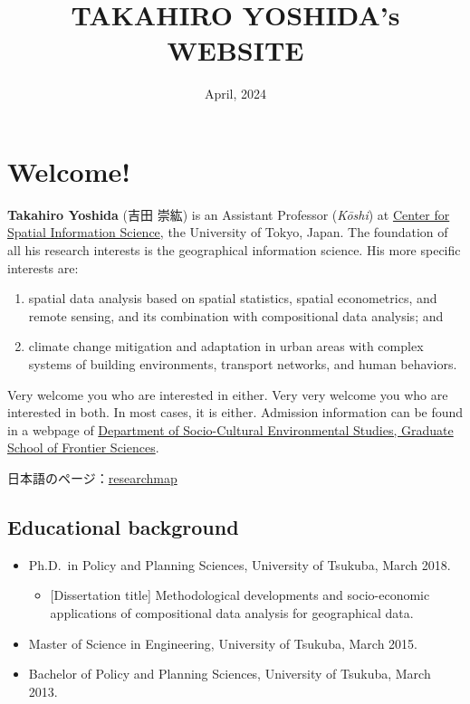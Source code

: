 \documentclass[
]{book}
\title{TAKAHIRO YOSHIDA's WEBSITE}
\author{}
\date{\vspace{-2.5em}April, 2024}
\providecommand{\tightlist}{%
  \setlength{\itemsep}{0pt}\setlength{\parskip}{0pt}}
\begin{document}
\maketitle

{
\setcounter{tocdepth}{1}
\tableofcontents
}
\chapter*{Welcome!}\label{welcome}

\textbf{Takahiro Yoshida} (吉田 崇紘) is an Assistant Professor (\emph{Kōshi}) at \href{https://www.csis.u-tokyo.ac.jp/en/}{Center for Spatial Information Science}, the University of Tokyo, Japan. The foundation of all his research interests is the geographical information science. His more specific interests are:

\begin{enumerate}
\def\labelenumi{(\arabic{enumi})}
\tightlist
\item
  spatial data analysis based on spatial statistics, spatial econometrics, and remote sensing, and its combination with compositional data analysis; and
\item
  climate change mitigation and adaptation in urban areas with complex systems of building environments, transport networks, and human behaviors.
\end{enumerate}

Very welcome you who are interested in either. Very very welcome you who are interested in both. In most cases, it is either. Admission information can be found in a webpage of \href{https://sbk.k.u-tokyo.ac.jp/index_e.html}{Department of Socio-Cultural Environmental Studies, Graduate School of Frontier Sciences}.

日本語のページ：\href{https://researchmap.jp/yoshida.takahiro}{researchmap}

\section*{Educational background}\label{educational-background}

\begin{itemize}
\tightlist
\item
  Ph.D.~in Policy and Planning Sciences, University of Tsukuba, March 2018.

  \begin{itemize}
  \tightlist
  \item
    {[}Dissertation title{]} Methodological developments and socio-economic applications of compositional data analysis for geographical data.
  \end{itemize}
\item
  Master of Science in Engineering, University of Tsukuba, March 2015.
\item
  Bachelor of Policy and Planning Sciences, University of Tsukuba, March 2013.
\end{itemize}
\end{document}

